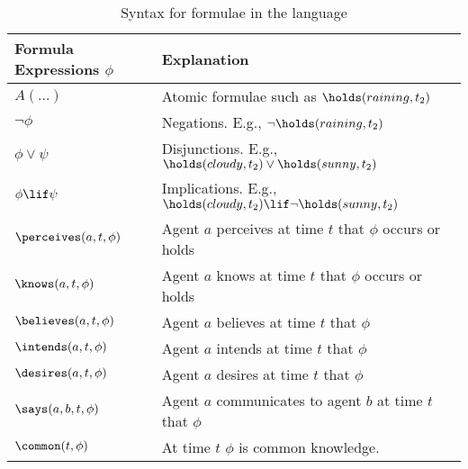 \begin{table}
\begin{footnotesize}
\begin{center}
\begin{tabular}{lp{10.3cm}}
\toprule
\textbf{Formula Expressions} $\phi$& \textbf{Explanation}  \\
\midrule
$A(\ldots)$ & Atomic formulae such as $\holds(raining, t_2)$\\
$\neg \phi$ & Negations. E.g., $\lnot\holds(raining, t_2)$\\
$\phi \lor \psi$ & Disjunctions. E.g., $\holds(cloudy, t_2)
\lor \holds(sunny, t_2)$\\
$\phi \lif \psi$ & Implications. E.g.,  $\holds(cloudy, t_2) \lif
                   \lnot \holds(sunny, t_2)$\\
$\perceives (a,t,\phi)$ & Agent $a$ perceives at time $t$ that $\phi$
                          occurs or holds \\
$\knows (a,t,\phi)$ & Agent $a$ knows at time $t$ that $\phi$
                          occurs or holds \\
$\believes (a,t,\phi)$ & Agent $a$ believes at time $t$ that $\phi$
                          \\
$\intends (a,t,\phi)$ & Agent $a$ intends at time $t$ that $\phi$
                          \\
$\desires (a,t,\phi)$ & Agent $a$ desires at time $t$ that $\phi$
                          \\

$\says (a,b,t,\phi)$ & Agent $a$ communicates to agent $b$ at time $t$
                       that $\phi$ \\
$\common (t,\phi)$ &At time $t$ $\phi$ is common knowledge.
                          \\
\bottomrule
\end{tabular}
\caption{Syntax for formulae in the language}
\label{syn:formulae}
\end{center}
\end{footnotesize}
\end{table}






